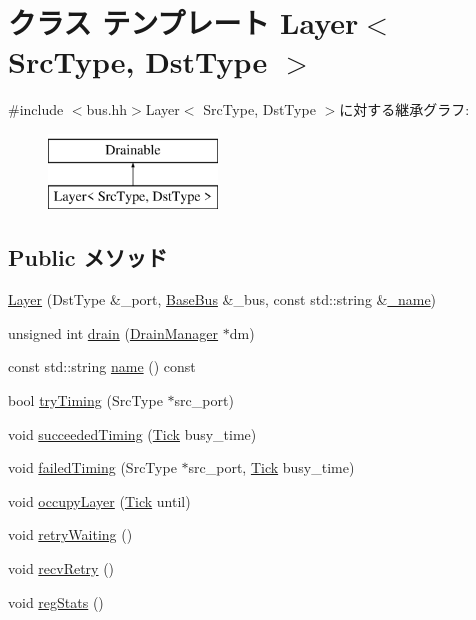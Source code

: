 \hypertarget{classBaseBus_1_1Layer}{
\section{クラス テンプレート Layer$<$ SrcType, DstType $>$}
\label{classBaseBus_1_1Layer}
}


{\ttfamily \#include $<$bus.hh$>$}Layer$<$ SrcType, DstType $>$に対する継承グラフ:\begin{figure}[H]
\begin{center}
\leavevmode
\includegraphics[height=2cm]{classBaseBus_1_1Layer}
\end{center}
\end{figure}
\subsection*{Public メソッド}
\begin{DoxyCompactItemize}
\item 
\hyperlink{classBaseBus_1_1Layer_a1206f14a8687ddf9256407d185fed584}{Layer} (DstType \&\_\-port, \hyperlink{classBaseBus}{BaseBus} \&\_\-bus, const std::string \&\hyperlink{classBaseBus_1_1Layer_aaf2ed934b37cbbd236fdd1b01a5f5005}{\_\-name})
\item 
unsigned int \hyperlink{classBaseBus_1_1Layer_aa8a18d230dba7a674ac8a0b4f35bc36a}{drain} (\hyperlink{classDrainManager}{DrainManager} $\ast$dm)
\item 
const std::string \hyperlink{classBaseBus_1_1Layer_a6490f765a824ced1cc94979609fe7e07}{name} () const 
\item 
bool \hyperlink{classBaseBus_1_1Layer_a903a48e7e621bc5add3149fdce906bc7}{tryTiming} (SrcType $\ast$src\_\-port)
\item 
void \hyperlink{classBaseBus_1_1Layer_a63792ad682fd60a25e2896f83452e877}{succeededTiming} (\hyperlink{base_2types_8hh_a5c8ed81b7d238c9083e1037ba6d61643}{Tick} busy\_\-time)
\item 
void \hyperlink{classBaseBus_1_1Layer_a024ba069e31ed6c6b68dc003c9613bc2}{failedTiming} (SrcType $\ast$src\_\-port, \hyperlink{base_2types_8hh_a5c8ed81b7d238c9083e1037ba6d61643}{Tick} busy\_\-time)
\item 
void \hyperlink{classBaseBus_1_1Layer_aa31a4364e1cce5c7aee0703fa8e289eb}{occupyLayer} (\hyperlink{base_2types_8hh_a5c8ed81b7d238c9083e1037ba6d61643}{Tick} until)
\item 
void \hyperlink{classBaseBus_1_1Layer_ae589ae2847102aa65e86ebc70414fea3}{retryWaiting} ()
\item 
void \hyperlink{classBaseBus_1_1Layer_a29cb5a4f98063ce6e9210eacbdb35298}{recvRetry} ()
\item 
void \hyperlink{classBaseBus_1_1Layer_a4dc637449366fcdfc4e764cdf12d9b11}{regStats} ()
\end{DoxyCompactItemize}
